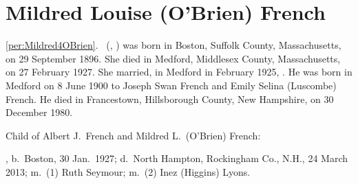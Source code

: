 \section{Mildred Louise (O'Brien) French}

\ref{per:Mildred4OBrien}.\  (, ) was born in Boston, Suffolk County, Massachusetts, on 29 September 1896.\cite{Mildred4OBrien2Birth} She died in Medford, Middlesex County, Massachusetts, on 27 February 1927.\cite{Mildred4OBrien2Death} She married, in Medford in February 1925, .\cite{Mildred4OBrienMarriage} He was born in Medford on 8 June 1900 to Joseph Swan French and Emily Selina (Luscombe) French.\cite{AlbertFrenchBirth} He died in Francestown, Hillsborough County, New Hampshire, on 30 December 1980.\cite{AlbertFrenchDeath,AlbertFrenchDeath2}

\begin{KidsIntro}
	Child of Albert J.\ French and Mildred L.\ (O'Brien) French:
\end{KidsIntro}

\begin{Kids}
	, b.\ Boston, 30 Jan.\ 1927;\cite{Albert5FrenchBirth} d.\ North Hampton, Rockingham Co., N.H., 24 March 2013;\cite{Albert5FrenchDeath} m.\ (1) Ruth Seymour;\cite{Albert5FrenchDeath} m.\ (2) Inez (Higgins) Lyons.\cite{Albert5FrenchDeath,InezFrenchDeath}
\end{Kids}